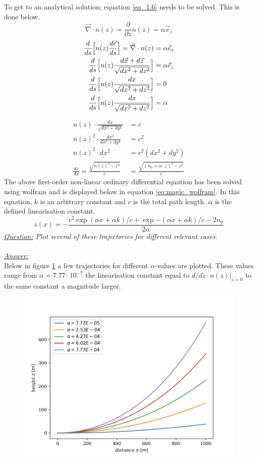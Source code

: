 \documentclass{article}
\begin{document}
To get to an analytical solution; equation \ref{eq_1.6} needs to be solved. This is done below.
\begin{equation*}
	\vec{\nabla} \cdot n(z) = \frac{\partial}{\partial z}n(z)= \alpha \vec{e}_z
\end{equation*}
\begin{align*}
	\frac{d}{ds} \Bigl[n(z)\frac{d\vec{r}}{ds}\Bigr] = \vec{\nabla}\cdot n(z) &= \alpha \vec{e}_z\\
	\frac{d}{ds} \Bigl[n(z)\frac{d\vec{x}+d\vec{z}}{\sqrt{dx^2 + dz^2}}\Bigr] &= \alpha \vec{e}_z\\
	\frac{d}{ds} \Bigl[n(z)\frac{dx}{\sqrt{dx^2 + dz^2}}\Bigr] &= 0\\
	\frac{d}{ds} \Bigl[n(z)\frac{dz}{\sqrt{dx^2 + dz^2}}\Bigr] &= \alpha\\
\end{align*}

\begin{align*}
	n(z)\cdot \frac{dx}{\sqrt{dx^2 + dy^2}} &= c\\
	n(z)^2 \cdot \frac{dx^2}{dx^2 + dy^2} &= c^2\\
	n(z)^2 \cdot dx^2 &= c^2(dx^2 + dy^2)\\
	\frac{dz}{dx} = \frac{\sqrt{n(z)^2 -c^2}}{c} &= \frac{\sqrt{(n_0+\alpha\cdot z)^2 -c^2}}{c}
\end{align*}
The above first-order non-linear ordinary differential equation has been solved using wolfram and is displayed below in equation \ref{eq:magic_wolfram}. In this equation, $k$ is an arbitrary constant and $c$ is the total path length. $\alpha$ is the defined linearisation constant.
\begin{equation}
	z(x)=-\frac{c^2 \exp{(\alpha x + \alpha k)/c}+\exp{-(\alpha x + \alpha k)/c}-2n_0}{2 \alpha}
	\label{eq:magic_wolfram}
\end{equation}
\textit{\underline{Question:} Plot several of these trajectories for different relevant cases.}\\
\\
\textit{\underline{Answer:}} \\
Below in figure \ref{fig:paths} a few trajectories for different $\alpha$-values are plotted. These values range from $\alpha = 7.77 \cdot 10^{-7}$ the linearisation constant equal to $d/dz \cdot n(z)\rvert_{z=0}$ to the same constant a magnitude larger.\\

\begin{figure}[h!]
	\centering
	\includegraphics[width=0.5\linewidth,keepaspectratio]{afbeeldingen/light path.png}
	\label{fig:paths}
\end{figure}
\end{document}
